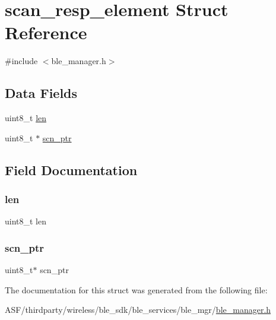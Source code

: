 \hypertarget{structscan__resp__element}{}\section{scan\+\_\+resp\+\_\+element Struct Reference}
\label{structscan__resp__element}


{\ttfamily \#include $<$ble\+\_\+manager.\+h$>$}

\subsection*{Data Fields}
\begin{DoxyCompactItemize}
\item 
uint8\+\_\+t \mbox{\hyperlink{structscan__resp__element_a5723e60ffd628510c699eddbce90be23}{len}}
\item 
uint8\+\_\+t $\ast$ \mbox{\hyperlink{structscan__resp__element_ab5699c8cdd6f3e889f433792aad393a3}{scn\+\_\+ptr}}
\end{DoxyCompactItemize}


\subsection{Field Documentation}
\mbox{\label{structscan__resp__element_a5723e60ffd628510c699eddbce90be23}} 
\subsubsection{\texorpdfstring{len}{len}}
{\footnotesize\ttfamily uint8\+\_\+t len}

\mbox{\label{structscan__resp__element_ab5699c8cdd6f3e889f433792aad393a3}} 
\subsubsection{\texorpdfstring{scn\_ptr}{scn\_ptr}}
{\footnotesize\ttfamily uint8\+\_\+t$\ast$ scn\+\_\+ptr}



The documentation for this struct was generated from the following file\+:\begin{DoxyCompactItemize}
\item 
A\+S\+F/thirdparty/wireless/ble\+\_\+sdk/ble\+\_\+services/ble\+\_\+mgr/\mbox{\hyperlink{ble__manager_8h}{ble\+\_\+manager.\+h}}\end{DoxyCompactItemize}
